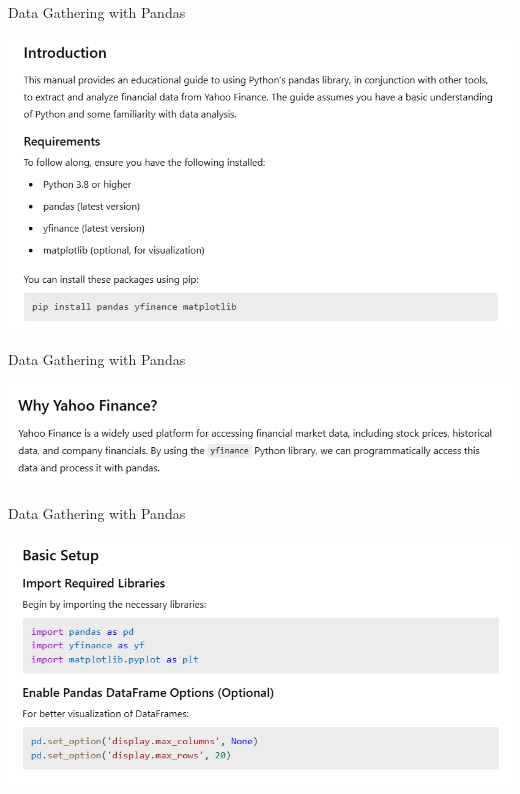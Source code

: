 \documentclass[11pt]{beamer}
\begin{document}
\begin{frame}{Data Gathering with Pandas}
	\begin{center}
	\includegraphics[scale=0.55]{../05-pictures/lesson-1-3_pic_12.png}
	\end{center}
\end{frame}
\begin{frame}{Data Gathering with Pandas}
	\begin{center}
	\includegraphics[scale=0.55]{../05-pictures/lesson-1-3_pic_13.png}
	\end{center}
\end{frame}
\begin{frame}{Data Gathering with Pandas}
	\begin{center}
	\includegraphics[scale=0.55]{../05-pictures/lesson-1-3_pic_14.png}
	\end{center}
\end{frame}
\end{document}
